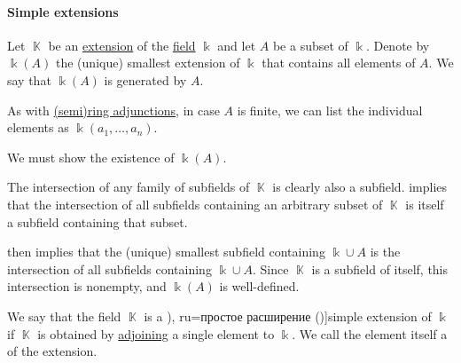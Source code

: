 \paragraph{Simple extensions}

\begin{definition}\label{def:field_adjunction}
  Let \( \BbbK \) be an \hyperref[def:field/submodel]{extension} of the \hyperref[def:field]{field} \( \Bbbk \) and let \( A \) be a subset of \( \Bbbk \). Denote by \( \Bbbk(A) \) the (unique) smallest extension of \( \Bbbk \) that contains all elements of \( A \). We say that \( \Bbbk(A) \) is generated by  \( A \).

  As with \hyperref[def:semiring_adjunction]{(semi)ring adjunctions}, in case \( A \) is finite, we can list the individual elements as \( \Bbbk(a_1, \ldots, a_n) \).
\end{definition}
\begin{defproof}
  We must show the existence of \( \Bbbk(A) \).

  The intersection of any family of subfields of \( \BbbK \) is clearly also a subfield.  implies that the intersection of all subfields containing an arbitrary subset of \( \BbbK \) is itself a subfield containing that subset.

   then implies that the (unique) smallest subfield containing \( \Bbbk \cup A \) is the intersection of all subfields containing \( \Bbbk \cup A \). Since \( \BbbK \) is a subfield of itself, this intersection is nonempty, and \( \Bbbk(A) \) is well-defined.
\end{defproof}

\begin{definition}\label{def:simple_field_extension}
  We say that the field \( \BbbK \) is a \term[bg=просто разширение (\cite[def. VI.3]{ГеновМиховскиМоллов1991}), ru=простое расширение (\cite[409]{Винберг2014})]{simple extension} of \( \Bbbk \) if \( \BbbK \) is obtained by \hyperref[def:field_adjunction]{adjoining} a single element to \( \Bbbk \). We call the element itself a  of the extension.
\end{definition}

